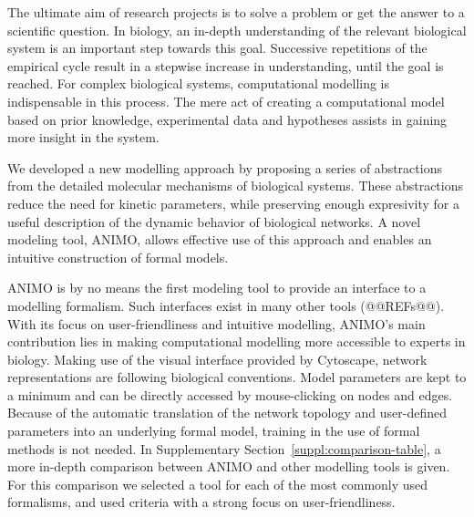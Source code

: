 The ultimate aim of research projects is to solve a problem or get
the answer to a scientific question. In biology, an in-depth understanding of
the relevant biological system is an important step towards this goal. Successive 
repetitions of the empirical cycle result in a stepwise increase in understanding,
until the goal is reached. For complex biological systems, computational modelling is 
indispensable in this process. The mere act of creating 
a computational model based on prior knowledge, experimental data and hypotheses 
assists in gaining more insight in the system. 


We developed a new modelling approach by proposing a series of abstractions from the detailed 
molecular mechanisms of biological systems. These abstractions reduce the need for kinetic 
parameters, while preserving enough expresivity for a useful description of the dynamic 
behavior of biological networks. A novel modeling tool, ANIMO, allows 
effective use of this approach and enables an intuitive construction of formal models.

ANIMO is by no means the first modeling tool to provide an interface to a
modelling formalism. Such interfaces exist in many other tools (@@REFs@@). With its
focus on user-friendliness and intuitive modelling, ANIMO's main contribution lies 
in making computational modelling more accessible to experts in biology.
Making use of the visual
interface provided by Cytoscape, network representations are following biological conventions. 
Model parameters are kept to a minimum and can be directly accessed by mouse-clicking on 
nodes and edges. Because of the automatic translation of the network topology and 
user-defined parameters into an underlying formal model, training in the use of formal methods 
is not needed. In Supplementary Section~\ref{suppl:comparison-table}, a more in-depth
comparison between ANIMO and other modelling tools is given. For this comparison we selected a tool
for each of the most commonly used formalisms, and used criteria with a strong focus on 
user-friendliness.

